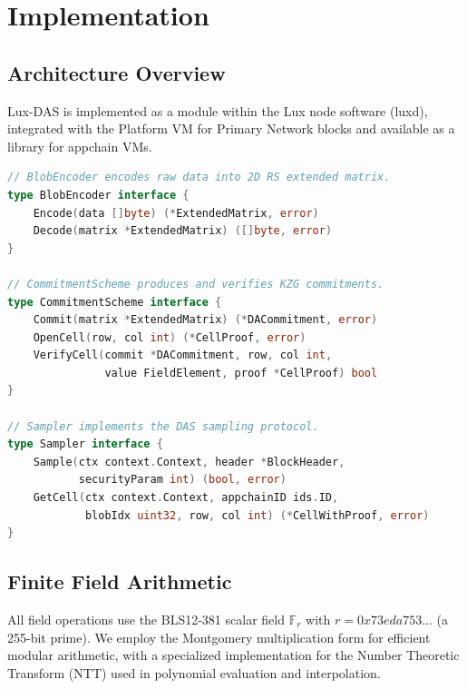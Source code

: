 \section{Implementation}

\label{sec:implementation}

\subsection{Architecture Overview}

Lux-DAS is implemented as a module within the Lux node software (luxd), integrated
with the Platform VM for Primary Network blocks and available as a library for appchain VMs.

\begin{lstlisting}[language=Go, caption={Core DAS interfaces}]
// BlobEncoder encodes raw data into 2D RS extended matrix.
type BlobEncoder interface {
    Encode(data []byte) (*ExtendedMatrix, error)
    Decode(matrix *ExtendedMatrix) ([]byte, error)
}

// CommitmentScheme produces and verifies KZG commitments.
type CommitmentScheme interface {
    Commit(matrix *ExtendedMatrix) (*DACommitment, error)
    OpenCell(row, col int) (*CellProof, error)
    VerifyCell(commit *DACommitment, row, col int,
               value FieldElement, proof *CellProof) bool
}

// Sampler implements the DAS sampling protocol.
type Sampler interface {
    Sample(ctx context.Context, header *BlockHeader,
           securityParam int) (bool, error)
    GetCell(ctx context.Context, appchainID ids.ID,
            blobIdx uint32, row, col int) (*CellWithProof, error)
}
\end{lstlisting}

\subsection{Finite Field Arithmetic}

All field operations use the BLS12-381 scalar field
$\mathbb{F}_r$ with $r = 0x73eda753\ldots$ (a 255-bit prime). We employ the Montgomery
multiplication form for efficient modular arithmetic, with a specialized implementation for
the Number Theoretic Transform (NTT) used in polynomial evaluation and interpolation.

